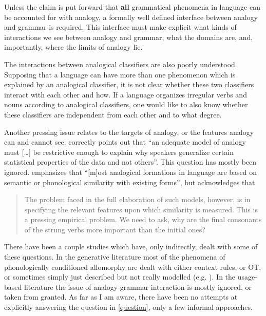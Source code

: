 Unless the claim is put forward that \textbf{all} grammatical phenomena in language can be accounted for with analogy, a formally well defined interface between analogy and grammar is required. This interface must make explicit what kinds of interactions we see between analogy and grammar, what the domains are, and, importantly, where the limits of analogy lie.

The interactions between analogical classifiers are also poorly understood. Supposing that a language can have more than one phenomenon which is explained by an analogical classifier, it is not clear whether these two classifiers interact with each other and how. If a language organizes irregular verbs and nouns according to analogical classifiers, one would like to also know whether these classifiers are independent from each other and to what degree.

Another pressing issue relates to the targets of analogy, or the features analogy can and cannot see. \textcite[p. 185]{Albright.2009} correctly points out that ``an adequate model of analogy must [\dots] be restrictive enough to explain why speakers generalize certain statistical properties of the data and not others''. This question has mostly been ignored. \textcite[p. 54]{Bybee.2010} emphasizes that ``[m]ost analogical formations in language are based on semantic or phonological similarity with existing forms'', but acknowledges that

\begin{quotation}
  The problem faced in the full elaboration of such models, however, is in specifying the relevant features upon which similarity is measured.
  This is a pressing empirical problem. We need to ask, why are the final consonants of the strung verbs more important than the initial ones? \autocite[p. 62]{Bybee.2010}
\end{quotation}

There have been a couple studies which have, only indirectly, dealt with some of these questions. In the generative literature most of the phenomena of phonologically conditioned allomorphy are dealt with either context rules, or OT, or sometimes simply just described but not really modelled (e.g. \cite[p. 119]{Rubach.2007}). In the usage-based literature the issue of analogy-grammar interaction is mostly ignored, or taken from granted. As far as I am aware, there have been no attempts at explicitly answering the question in \ref{question}, only a few informal approaches.

